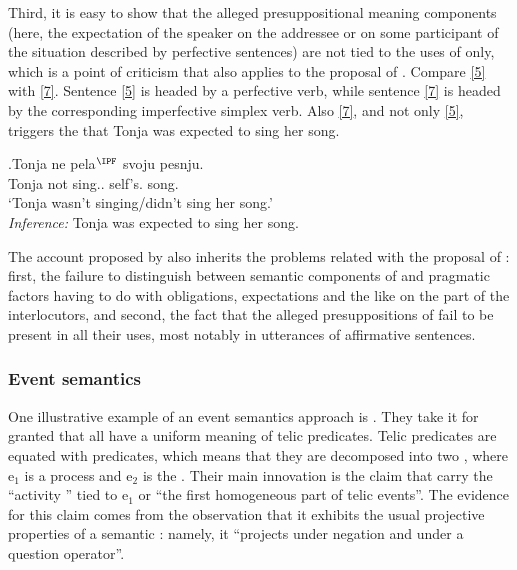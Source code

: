 Third, it is easy to show that the alleged presuppositional meaning components (here, the expectation of the speaker on the addressee or on some participant of the situation described by perfective sentences) are not tied to the uses of  only, which is a point of criticism that also applies to the proposal of \citet{Paducheva:96}. Compare \ref{5} with \ref{7}. Sentence \ref{5} is headed by a perfective verb, while sentence \ref{7} is headed by the corresponding imperfective simplex verb. Also \ref{7}, and not only \ref{5}, triggers the  that Tonja was expected to sing her song.

\exg.\label{7}Tonja ne pela$^{\IPF}$ svoju pesnju.\\
 Tonja not sing.. self's. song.\\
 \trans `Tonja wasn't singing/didn't sing her song.'\\
\textit{Inference:} Tonja was expected to sing her song.

The account proposed by \citet{Romanova:06} also inherits the problems related with the proposal of \citet{Paducheva:96}: first, the failure to distinguish between semantic components of  and pragmatic factors having to do with obligations, expectations and the like on the part of the interlocutors, and second, the fact that the alleged presuppositions of  fail to be present in all their uses, most notably in utterances of affirmative sentences. 

\subsubsection{Event semantics}
One illustrative example of an event semantics approach is \citet{Docekal:09}. They take it for granted that all  have a uniform meaning of telic predicates. Telic predicates are equated with  predicates, which means that they are decomposed into two , where e$_1$ is a process and e$_2$ is the  \citep[mainly following][]{Giorgi:01}. Their main innovation is the claim that  carry the ``activity '' tied to e$_1$ or ``the first homogeneous part of telic events''. The evidence for this claim comes from the observation that it exhibits the usual projective properties of a semantic : namely, it ``projects under negation and under a question operator''.

